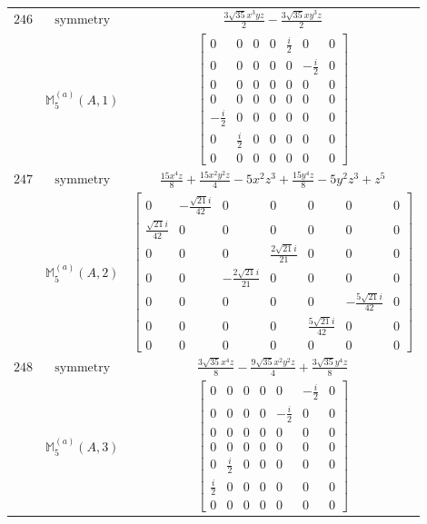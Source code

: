 \documentclass[fleqn,8pt,landscape]{jsarticle}
\begin{document}
\begin{longtable}{ccc}
$ 246 $ & $ \text{symmetry} $ & $ \frac{3 \sqrt{35} x^{3} y z}{2} - \frac{3 \sqrt{35} x y^{3} z}{2} $ \\
$  $ & $ \mathbb{M}_{5}^{(a)}(A,1) $ & $ \begin{bmatrix} 0 & 0 & 0 & 0 & \frac{i}{2} & 0 & 0 \\ 0 & 0 & 0 & 0 & 0 & - \frac{i}{2} & 0 \\ 0 & 0 & 0 & 0 & 0 & 0 & 0 \\ 0 & 0 & 0 & 0 & 0 & 0 & 0 \\ - \frac{i}{2} & 0 & 0 & 0 & 0 & 0 & 0 \\ 0 & \frac{i}{2} & 0 & 0 & 0 & 0 & 0 \\ 0 & 0 & 0 & 0 & 0 & 0 & 0 \end{bmatrix} $ \\ \hline
$ 247 $ & $ \text{symmetry} $ & $ \frac{15 x^{4} z}{8} + \frac{15 x^{2} y^{2} z}{4} - 5 x^{2} z^{3} + \frac{15 y^{4} z}{8} - 5 y^{2} z^{3} + z^{5} $ \\
$  $ & $ \mathbb{M}_{5}^{(a)}(A,2) $ & $ \begin{bmatrix} 0 & - \frac{\sqrt{21} i}{42} & 0 & 0 & 0 & 0 & 0 \\ \frac{\sqrt{21} i}{42} & 0 & 0 & 0 & 0 & 0 & 0 \\ 0 & 0 & 0 & \frac{2 \sqrt{21} i}{21} & 0 & 0 & 0 \\ 0 & 0 & - \frac{2 \sqrt{21} i}{21} & 0 & 0 & 0 & 0 \\ 0 & 0 & 0 & 0 & 0 & - \frac{5 \sqrt{21} i}{42} & 0 \\ 0 & 0 & 0 & 0 & \frac{5 \sqrt{21} i}{42} & 0 & 0 \\ 0 & 0 & 0 & 0 & 0 & 0 & 0 \end{bmatrix} $ \\ \hline
$ 248 $ & $ \text{symmetry} $ & $ \frac{3 \sqrt{35} x^{4} z}{8} - \frac{9 \sqrt{35} x^{2} y^{2} z}{4} + \frac{3 \sqrt{35} y^{4} z}{8} $ \\
$  $ & $ \mathbb{M}_{5}^{(a)}(A,3) $ & $ \begin{bmatrix} 0 & 0 & 0 & 0 & 0 & - \frac{i}{2} & 0 \\ 0 & 0 & 0 & 0 & - \frac{i}{2} & 0 & 0 \\ 0 & 0 & 0 & 0 & 0 & 0 & 0 \\ 0 & 0 & 0 & 0 & 0 & 0 & 0 \\ 0 & \frac{i}{2} & 0 & 0 & 0 & 0 & 0 \\ \frac{i}{2} & 0 & 0 & 0 & 0 & 0 & 0 \\ 0 & 0 & 0 & 0 & 0 & 0 & 0 \end{bmatrix} $ \\ \hline

\end{longtable}
\end{document}
